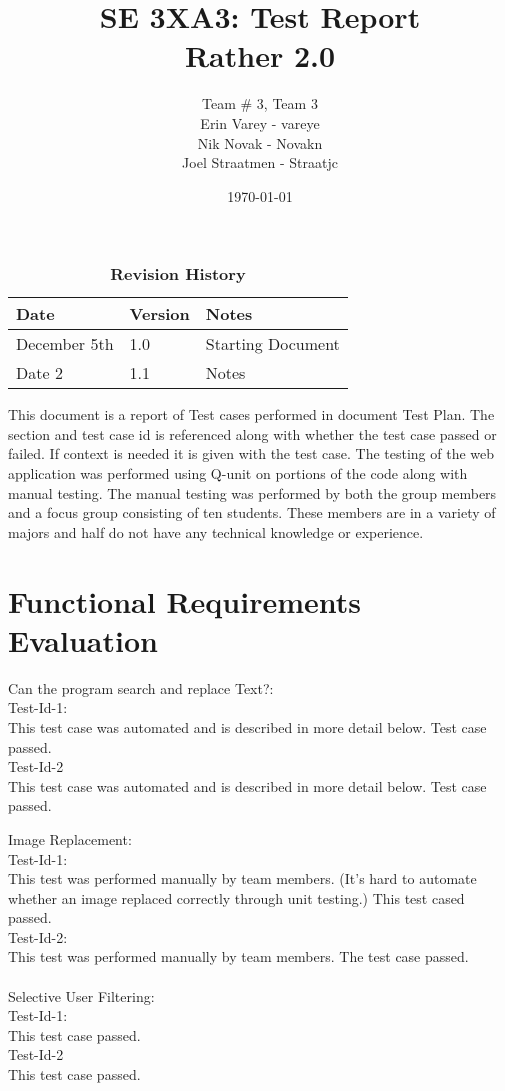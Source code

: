 \documentclass[12pt, titlepage]{article}
\title{SE 3XA3: Test Report\\Rather 2.0}
\author{Team \# 3, Team 3
		\\ Erin Varey - vareye
		\\ Nik Novak - Novakn
		\\ Joel Straatmen - Straatjc
}
\date{\today}
\begin{document}
\maketitle
{}
\tableofcontents
\listoftables
\listoffigures
\begin{table}[bp]
\caption{\bf Revision History}
\begin{tabularx}{\textwidth}{p{3cm}p{2cm}X}
\toprule {\bf Date} & {\bf Version} & {\bf Notes}\\
\midrule
December 5th & 1.0 & Starting Document\\
Date 2 & 1.1 & Notes\\
\bottomrule
\end{tabularx}
\end{table}
\newpage
{}
This document is a report of Test cases performed in document Test Plan. The section and test case id is referenced along with whether the test case passed or failed. If context is needed it is given with the test case. The testing of the web application was performed using Q-unit on portions of the code along with manual testing. The manual testing was performed by both the group members and a focus group consisting of ten students. These members are in a variety of majors and half do not have any technical knowledge or experience.\\
\section{Functional Requirements Evaluation}

Can the program search and replace Text?: \\
Test-Id-1:\\
This test case was automated and is described in more detail below. Test case passed.\\
Test-Id-2\\
This test case was automated and is described in more detail below. Test case passed.


Image Replacement: \\
Test-Id-1: \\
This test was performed manually by team members. (It's hard to automate whether an image replaced correctly through unit testing.) This test cased passed.\\
Test-Id-2:\\
This test was performed manually by team members. The test case passed.\\
\\
Selective User Filtering: \\
Test-Id-1: \\
This test case passed. \\
Test-Id-2 \\
This test case passed. \\
\\
\end{document}
